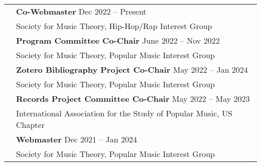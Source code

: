 \documentclass[letterpaper, 11pt]{article}
\begin{document}
\begin{longtable}{p{1.3in}p{4.8in}}
\newpage
{\color{OliveGreen}{Professional Service}}
& \textbf{Co-Webmaster} \hfill Dec 2022  -- Present \\
& Society for Music Theory, Hip-Hop/Rap Interest Group \\
& \textbf{Program Committee Co-Chair} \hfill June 2022  -- Nov 2022 \\
& Society for Music Theory, Popular Music Interest Group \\
& \textbf{Zotero Bibliography Project Co-Chair} \hfill May 2022  -- Jan 2024 \\
& Society for Music Theory, Popular Music Interest Group \\
& \textbf{Records Project Committee Co-Chair} \hfill May 2022  -- May 2023 \\
& International Association for the Study of Popular Music, US Chapter\\
& \textbf{Webmaster} \hfill Dec 2021  -- Jan 2024 \\
& Society for Music Theory, Popular Music Interest Group \\



\end{longtable}
\end{document}
